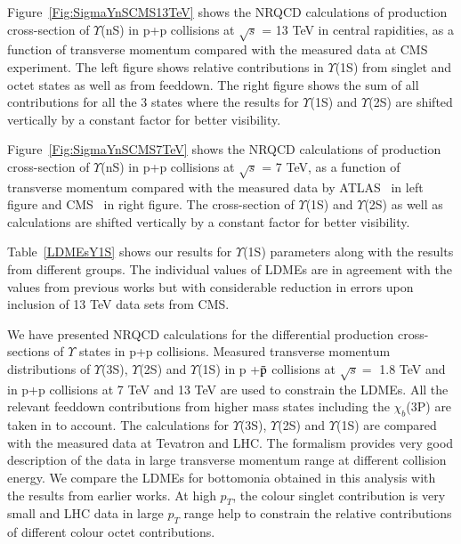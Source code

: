 Figure~\ref{Fig:SigmaYnSCMS13TeV} shows the NRQCD calculations of production cross-section of $\Upsilon$(nS)
      in p+p collisions at $\sqrt{s}$ = 13 TeV in central rapidities, as a function of
      transverse momentum compared with the measured data at CMS~\cite{Sirunyan:2017qdw}
      experiment. The left figure shows relative contributions in $\Upsilon$(1S) from
      singlet and octet states as well as from feeddown. The right figure shows the sum
      of all contributions for all the 3 states where the results for $\Upsilon$(1S) and
      $\Upsilon$(2S) are shifted vertically by a constant factor for better visibility.


Figure~\ref{Fig:SigmaYnSCMS7TeV} shows the NRQCD calculations of production cross-section of $\Upsilon$(nS) in
      p+p collisions at $\sqrt{s}$ = 7 TeV, as a function of transverse momentum compared with
      the measured data by ATLAS~\cite{Aad:2012dlq} in left figure and CMS~\cite{Chatrchyan:2013yna}
      in right figure. The cross-section of $\Upsilon$(1S) and $\Upsilon$(2S) as well as
      calculations are shifted vertically by a constant factor for better visibility.

  
Table~\ref{LDMEsY1S} shows our results for $\Upsilon$(1S) parameters along with
the results from different groups. The individual values of LDMEs are in agreement with
the values from previous works but with considerable reduction in 
errors upon inclusion of 13 TeV data sets from CMS.

We have presented NRQCD calculations for the differential production 
cross-sections of $\Upsilon$ states in  p+p collisions.  Measured transverse momentum
distributions of $\Upsilon$(3S), 
$\Upsilon$(2S) and $\Upsilon$(1S) in p +{$\bar {\rm p}$} collisions at $\sqrt{s}=$ 1.8 TeV and in 
p+p collisions at 7 TeV and 13 TeV are used to constrain the LDMEs. All the relevant feeddown
contributions from higher mass states including the $\chi_{b}$(3P) are taken in to account.
The calculations for  $\Upsilon$(3S), $\Upsilon$(2S) and $\Upsilon$(1S) are compared with 
the measured data at Tevatron and LHC. The formalism provides  very good description of the data in 
large transverse momentum range at different collision energy. 
We compare the LDMEs for bottomonia obtained in this analysis with the results from earlier works.
At high $p_T$, the colour singlet contribution is very small and LHC data in large $p_T$ range 
help to constrain the relative contributions of different colour octet contributions.


